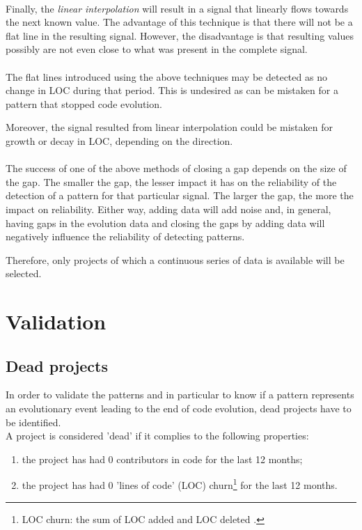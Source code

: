 \paragraph{}
Finally, the \textit{linear interpolation} will result in a signal that
linearly flows towards the next known value. The advantage of this technique is
that there will not be a flat line in the resulting signal. However, the
disadvantage is that resulting values possibly are not even close to what was
present in the complete signal.

\paragraph{}
The flat lines introduced using the above techniques may be detected as no
change in LOC during that period. This is undesired as can be mistaken for a
pattern that stopped code evolution.

Moreover, the signal resulted from linear interpolation could be mistaken for
growth or decay in LOC, depending on the direction.

\paragraph{}
The success of one of the above methods of closing a gap depends on the size of
the gap. The smaller the gap, the lesser impact it has on the reliability of
the detection of a pattern for that particular signal. The larger the gap, the
more the impact on reliability. Either way, adding data will add noise and, in
general, having gaps in the evolution data and closing the gaps by adding data
will negatively influence the reliability of detecting patterns.

Therefore, only projects of which a continuous series of data is available will
be selected.

\section{Validation}
\subsection{Dead projects}
\label{method:validation}
In order to validate the patterns and in particular to know if a pattern
represents an evolutionary event leading to the end of code evolution, dead
projects have to be identified.\\

\noindent
\label{def:dead}
A project is considered 'dead' if it complies to the following properties:
\begin{enumerate}
	\item the project has had 0 contributors in code for the last 12 months;
	\item the project has had 0 'lines of code' (LOC) churn\footnote{LOC churn:
	the sum of LOC added and LOC deleted \cite{elbaum}.} for the last 12 months.
\end{enumerate}


